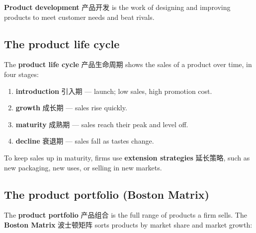 \documentclass[11pt]{article}
\begin{document}
\textbf{Product development} 产品开发 is the work of designing and improving products to meet customer needs and beat rivals.

\subsection*{The product life cycle}

The \textbf{product life cycle} 产品生命周期 shows the sales of a product over time, in four stages:

\begin{enumerate}
\item \textbf{introduction} 引入期 — launch; low sales, high promotion cost.

\item \textbf{growth} 成长期 — sales rise quickly.

\item \textbf{maturity} 成熟期 — sales reach their peak and level off.

\item \textbf{decline} 衰退期 — sales fall as tastes change.

\end{enumerate}

To keep sales up in maturity, firms use \textbf{extension strategies} 延长策略, such as new packaging, new uses, or selling in new markets.

\subsection*{The product portfolio (Boston Matrix)}

The \textbf{product portfolio} 产品组合 is the full range of products a firm sells. The \textbf{Boston Matrix} 波士顿矩阵 sorts products by market share and market growth:

\begin{center}
\end{center}
\end{document}
